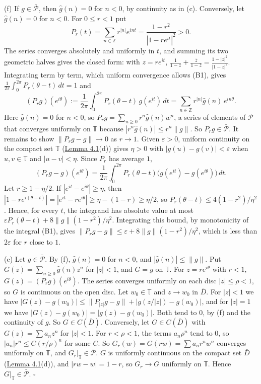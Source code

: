 \documentclass[
  english,
  11pt,
  a4paper,
]{article}
\begin{document}
(f) If \(g\in\bar{\mathcal P}\), then \(\hat g(n)=0\) for \(n<0\), by
continuity as in (c). Conversely, let \(\hat g(n)=0\) for \(n<0\). For
\(0\leq r<1\) put
\[P_r(t)=\sum_{n\in\mathbb Z}r^{|n|}e^{int}=\frac{1-r^2}{|1-re^{it}|^2}>0 .\]
The series converges absolutely and uniformly in \(t\), and summing its
two geometric halves gives the closed form: with \(z=re^{it}\),
\(\frac1{1-z}+\frac{\bar z}{1-\bar z}=\frac{1-|z|^2}{|1-z|^2}\).
Integrating term by term, which uniform convergence allows (B1), gives
\(\frac1{2\pi}\int_0^{2\pi}P_r(\theta-t)\,dt=1\) and
\[(P_rg)(e^{i\theta}):=\frac1{2\pi}\int_0^{2\pi}P_r(\theta-t)\,g(e^{it})\,dt=\sum_{n\in\mathbb Z}r^{|n|}\hat g(n)\,e^{in\theta}.\]
Here \(\hat g(n)=0\) for \(n<0\), so
\(P_rg=\sum_{n\geq0}r^n\hat g(n)w^n\), a series of elements of
\(\mathcal P\) that converges uniformly on \(\mathbb T\) because
\(|r^n\hat g(n)|\leq r^n\|g\|\). So \(P_rg\in\bar{\mathcal P}\). It
remains to show \(\|P_rg-g\|\to0\) as \(r\to1\). Given
\(\varepsilon>0\), uniform continuity on the compact set \(\mathbb T\)
(\hyperlink{the-stone-weierstrass-theorem-for-functions-vanishing-at-infinity--oa-fnd-sw-15}{Lemma
4.1}(d)) gives \(\eta>0\) with \(|g(u)-g(v)|<\varepsilon\) when
\(u,v\in\mathbb T\) and \(|u-v|<\eta\). Since \(P_r\) has average \(1\),
\[(P_rg-g)(e^{i\theta})=\frac1{2\pi}\int_0^{2\pi}P_r(\theta-t)\bigl(g(e^{it})-g(e^{i\theta})\bigr)\,dt .\]
Let \(r\geq1-\eta/2\). If \(|e^{it}-e^{i\theta}|\geq\eta\), then
\(|1-re^{i(\theta-t)}|=|e^{it}-re^{i\theta}|\geq\eta-(1-r)\geq\eta/2\),
so \(P_r(\theta-t)\leq4(1-r^2)/\eta^2\). Hence, for every \(t\), the
integrand has absolute value at most
\(\varepsilon P_r(\theta-t)+8\|g\|(1-r^2)/\eta^2\). Integrating this
bound, by monotonicity of the integral (B1), gives
\(\|P_rg-g\|\leq\varepsilon+8\|g\|(1-r^2)/\eta^2\), which is less than
\(2\varepsilon\) for \(r\) close to \(1\).

(e) Let \(g\in\bar{\mathcal P}\). By (f), \(\hat g(n)=0\) for \(n<0\),
and \(|\hat g(n)|\leq\|g\|\). Put \(G(z)=\sum_{n\geq0}\hat g(n)z^n\) for
\(|z|<1\), and \(G=g\) on \(\mathbb T\). For \(z=re^{i\theta}\) with
\(r<1\), \(G(z)=(P_rg)(e^{i\theta})\). The series converges uniformly on
each disc \(|z|\leq\rho<1\), so \(G\) is continuous on the open disc.
Let \(w_0\in\mathbb T\) and \(z\to w_0\) in \(\bar D\). For \(|z|<1\) we
have \(|G(z)-g(w_0)|\leq\|P_{|z|}g-g\|+|g(z/|z|)-g(w_0)|\), and for
\(|z|=1\) we have \(|G(z)-g(w_0)|=|g(z)-g(w_0)|\). Both tend to \(0\),
by (f) and the continuity of \(g\). So \(G\in C(\bar D)\). Conversely,
let \(G\in C(\bar D)\) with \(G(z)=\sum a_nz^n\) for \(|z|<1\). For
\(r<\rho<1\), the terms \(a_n\rho^n\) tend to \(0\), so
\(|a_n|r^n\leq C(r/\rho)^n\) for some \(C\). So
\(G_r(w)=G(rw)=\sum a_nr^nw^n\) converges uniformly on \(\mathbb T\),
and \(G_r|_{\mathbb T}\in\bar{\mathcal P}\). \(G\) is uniformly
continuous on the compact set \(\bar D\)
(\hyperlink{the-stone-weierstrass-theorem-for-functions-vanishing-at-infinity--oa-fnd-sw-15}{Lemma
4.1}(d)), and \(|rw-w|=1-r\), so \(G_r\to G\) uniformly on
\(\mathbb T\). Hence \(G|_{\mathbb T}\in\bar{\mathcal P}\). \(\square\)
\end{document}
